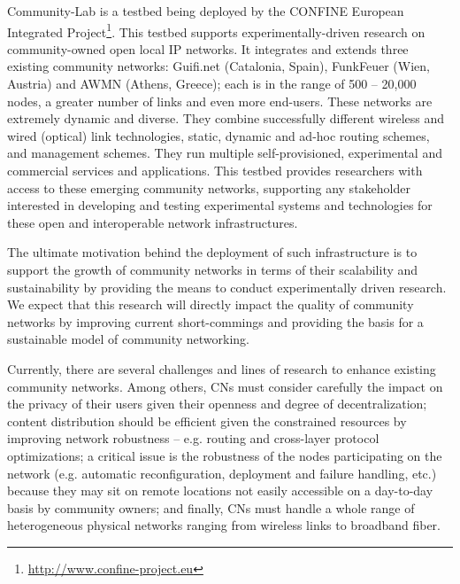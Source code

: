 \documentclass[conference]{IEEEtran}
\begin{document}
Community-Lab is a testbed being deployed by the CONFINE European
Integrated Project\footnote{\url{http://www.confine-project.eu}}. This testbed supports experimentally-driven research
on community-owned open local IP networks. It integrates and extends 
three existing community networks: Guifi.net (Catalonia, Spain),
FunkFeuer (Wien, Austria) and AWMN (Athens, Greece); each is in the
range of 500 -- 20,000 nodes, a greater number of links and even more end-users.
These networks are extremely dynamic and diverse. They combine
successfully different wireless and wired (optical) link technologies, static, dynamic
and ad-hoc routing schemes, and management schemes. They run multiple
self-provisioned, experimental and commercial services and applications.
This testbed provides researchers with access to these emerging
community networks, supporting any stakeholder interested in developing
and testing experimental systems and technologies for these open
and interoperable network infrastructures.


The ultimate motivation behind the deployment of such infrastructure is 
to support the growth of community networks in terms of their scalability and
sustainability by providing the means to conduct experimentally driven research. 
We expect that this research will directly impact the quality of community networks
by improving current short-commings and providing the basis for a sustainable
model of community networking.


Currently, there are several challenges and lines of research to enhance existing
community networks. Among others, CNs must consider carefully the impact on the privacy of their
users given their openness and degree of decentralization; content distribution 
should be efficient given the constrained resources by improving network robustness 
-- e.g. routing and cross-layer protocol optimizations; a critical issue is the
robustness of the nodes participating on the network (e.g. automatic reconfiguration,
deployment and failure handling, etc.) because they may sit on remote locations not
easily accessible on a day-to-day basis by community owners; and finally, CNs must handle a whole range
of heterogeneous physical networks ranging from wireless links to broadband fiber.
\end{document}
